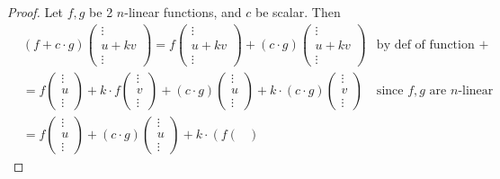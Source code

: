 \begin{proof}
Let \(f, g\) be 2 \(n\)-linear functions, and \(c\) be scalar.
Then
\begin{align*}
    & (f + c \cdot g) \begin{pmatrix}
        \vdots \\
        u + kv \\
        \vdots
    \end{pmatrix} = f \begin{pmatrix}
        \vdots \\
        u + kv \\
        \vdots
    \end{pmatrix} + (c \cdot g) \begin{pmatrix}
        \vdots \\
        u + kv \\
        \vdots
    \end{pmatrix} & \text{by def of function \(+\)} \\
    & = f \begin{pmatrix}
        \vdots \\
        u \\
        \vdots
    \end{pmatrix} + k \cdot f \begin{pmatrix}
        \vdots \\
        v \\
        \vdots
    \end{pmatrix} + (c \cdot g) \begin{pmatrix}
        \vdots \\
        u \\
        \vdots
    \end{pmatrix} +
    k \cdot (c \cdot g) \begin{pmatrix}
        \vdots \\
        v \\
        \vdots
    \end{pmatrix} & \text{since \(f, g\) are \(n\)-linear} \\
    & = f \begin{pmatrix}
        \vdots \\
        u \\
        \vdots
    \end{pmatrix} + (c \cdot g) \begin{pmatrix}
        \vdots \\
        u \\
        \vdots
    \end{pmatrix} + k \cdot \left( f \begin{pmatrix}

\end{pmatrix}
\end{align*}
\end{proof}
